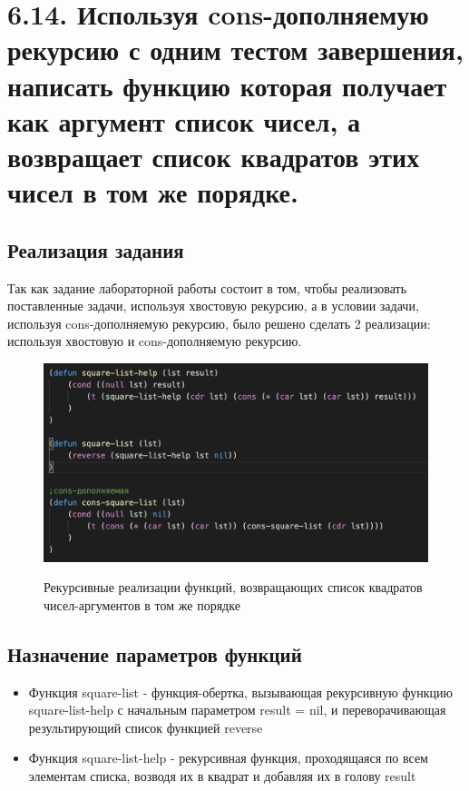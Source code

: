 \documentclass[a4paper,12pt]{article}
\begin{document}
 	\newpage
 	
 	\section*{6.14. Используя cons-дополняемую рекурсию с одним тестом завершения,
написать функцию которая получает как аргумент список чисел, а возвращает список квадратов этих чисел в том же порядке.
 	}
 	
 	\subsection*{Реализация задания}
 	
 	Так как задание лабораторной работы состоит в том, чтобы реализовать поставленные задачи, используя хвостовую рекурсию, а в условии задачи, используя cons-дополняемую рекурсию, было решено сделать 2 реализации: используя хвостовую и cons-дополняемую рекурсию.
 	
 	\begin{figure}[h!]
 		\begin{center}
 			{\includegraphics[scale = 0.8]{6.14.png}}
 			\label{ris:6.14}
 		\end{center}
 	\caption{Рекурсивные реализации функций, возвращающих список квадратов чисел-аргументов в том же порядке}
 	\end{figure}
 	
 	\subsection*{Назначение параметров функций}
 	
 	\begin{itemize}
 		\item Функция square-list - функция-обертка, вызывающая рекурсивную функцию square-list-help с начальным параметром result = nil, и переворачивающая результирующий список функцией reverse
 		\item Функция square-list-help - рекурсивная функция, проходящаяся по всем элементам списка, возводя их в квадрат и добавляя их в голову result
 	\end{itemize}
 	
\end{document}
